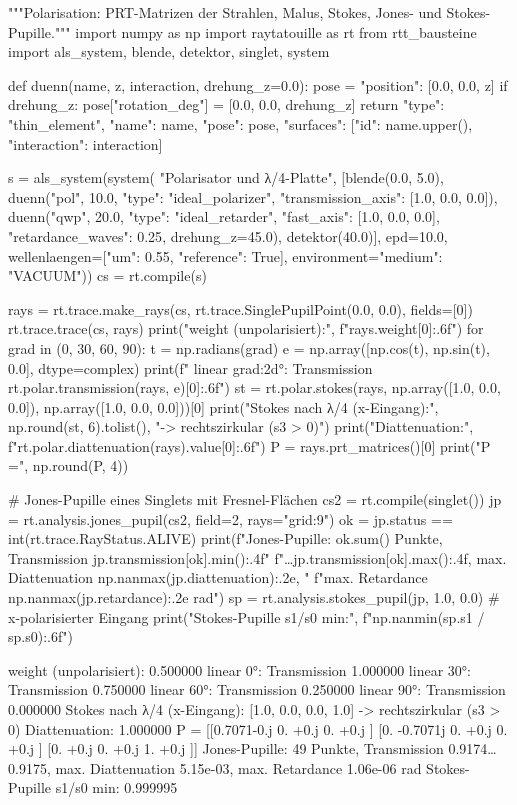 \documentclass[11pt,a4paper,openany]{book}
\DeclareRobustCommand{\code}[1]{\texttt{\directlua{rttcode("\luaescapestring{\detokenize{#1}}")}}}
\begin{document}
\begin{pycode}[title={\code{ex11_polarisation.py}}]
"""Polarisation: PRT-Matrizen der Strahlen, Malus, Stokes, Jones- und Stokes-Pupille."""
import numpy as np
import raytatouille as rt
from rtt_bausteine import als_system, blende, detektor, singlet, system


def duenn(name, z, interaction, drehung_z=0.0):
    pose = {"position": [0.0, 0.0, z]}
    if drehung_z:
        pose["rotation_deg"] = [0.0, 0.0, drehung_z]
    return {"type": "thin_element", "name": name, "pose": pose,
            "surfaces": [{"id": name.upper(), "interaction": interaction}]}


s = als_system(system(
    "Polarisator und λ/4-Platte",
    [blende(0.0, 5.0),
     duenn("pol", 10.0, {"type": "ideal_polarizer", "transmission_axis": [1.0, 0.0, 0.0]}),
     duenn("qwp", 20.0, {"type": "ideal_retarder", "fast_axis": [1.0, 0.0, 0.0],
                         "retardance_waves": 0.25}, drehung_z=45.0),
     detektor(40.0)],
    epd=10.0, wellenlaengen=[{"um": 0.55, "reference": True}], environment={"medium": "VACUUM"}))
cs = rt.compile(s)

rays = rt.trace.make_rays(cs, rt.trace.SinglePupilPoint(0.0, 0.0), fields=[0])
rt.trace.trace(cs, rays)
print("weight (unpolarisiert):", f"{rays.weight[0]:.6f}")
for grad in (0, 30, 60, 90):
    t = np.radians(grad)
    e = np.array([np.cos(t), np.sin(t), 0.0], dtype=complex)
    print(f"  linear {grad:2d}°: Transmission {rt.polar.transmission(rays, e)[0]:.6f}")
st = rt.polar.stokes(rays, np.array([1.0, 0.0, 0.0]), np.array([1.0, 0.0, 0.0]))[0]
print("Stokes nach λ/4 (x-Eingang):", np.round(st, 6).tolist(), "-> rechtszirkular (s3 > 0)")
print("Diattenuation:", f"{rt.polar.diattenuation(rays).value[0]:.6f}")
P = rays.prt_matrices()[0]
print("P =\n", np.round(P, 4))

# Jones-Pupille eines Singlets mit Fresnel-Flächen
cs2 = rt.compile(singlet())
jp = rt.analysis.jones_pupil(cs2, field=2, rays="grid:9")
ok = jp.status == int(rt.trace.RayStatus.ALIVE)
print(f"Jones-Pupille: {ok.sum()} Punkte, Transmission {jp.transmission[ok].min():.4f}"
      f"…{jp.transmission[ok].max():.4f}, max. Diattenuation {np.nanmax(jp.diattenuation):.2e}, "
      f"max. Retardance {np.nanmax(jp.retardance):.2e} rad")
sp = rt.analysis.stokes_pupil(jp, 1.0, 0.0)            # x-polarisierter Eingang
print("Stokes-Pupille s1/s0 min:", f"{np.nanmin(sp.s1 / sp.s0):.6f}")
\end{pycode}
\begin{ausgabe}
weight (unpolarisiert): 0.500000
  linear  0°: Transmission 1.000000
  linear 30°: Transmission 0.750000
  linear 60°: Transmission 0.250000
  linear 90°: Transmission 0.000000
Stokes nach λ/4 (x-Eingang): [1.0, 0.0, 0.0, 1.0] -> rechtszirkular (s3 > 0)
Diattenuation: 1.000000
P =
 [[0.7071-0.j     0.    +0.j     0.    +0.j    ]
 [0.    -0.7071j 0.    +0.j     0.    +0.j    ]
 [0.    +0.j     0.    +0.j     1.    +0.j    ]]
Jones-Pupille: 49 Punkte, Transmission 0.9174…0.9175, max. Diattenuation 5.15e-03, max. Retardance 1.06e-06 rad
Stokes-Pupille s1/s0 min: 0.999995
\end{ausgabe}
\end{document}
